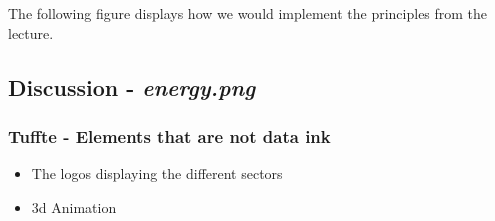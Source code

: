 \documentclass[a4paper]{article}
\begin{document}
    The following figure displays how we would implement the principles from the lecture.
    


    \subsection{Discussion - \textit{energy.png}}

    \subsubsection{Tuffte - Elements that are not \textbf{data ink}}
    \begin{itemize}
        \item The logos displaying the different sectors
        \item 3d Animation
    \end{itemize}
\end{document}
